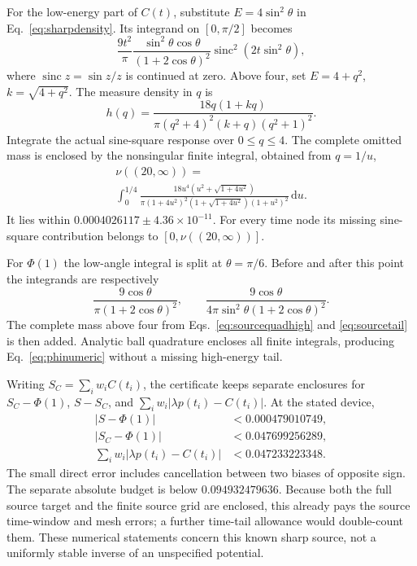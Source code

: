 \documentclass[aps,pra,reprint,superscriptaddress,longbibliography]{revtex4-2}
\newcommand{\dd}{\mathrm d}
\newcommand{\sinc}{\operatorname{sinc}}
\begin{document}
For the low-energy part of $C(t)$, substitute $E=4\sin^2\theta$ in
Eq.~\eqref{eq:sharpdensity}. Its integrand on $[0,\pi/2]$ becomes
\begin{equation}
 \frac{9t^2}{\pi}
 \frac{\sin^2\theta\cos\theta}{(1+2\cos\theta)^2}
                 \sinc^2(2t\sin^2\theta),                   \label{eq:sourcequadlow}
\end{equation}
where $\sinc z=\sin z/z$ is continued at zero. Above four, set
$E=4+q^2$, $k=\sqrt{4+q^2}$. The measure density in $q$ is
\begin{equation}
 h(q)=\frac{18q(1+kq)}
          {\pi(q^2+4)^2(k+q)(q^2+1)^2}.                       \label{eq:sourcequadhigh}
\end{equation}
Integrate the actual sine-square response over $0\le q\le4$.
The complete omitted mass is enclosed by the nonsingular finite
integral, obtained from $q=1/u$,
\begin{equation}
 \begin{gathered}
 \nu((20,\infty))=
 \\
 \int_0^{1/4}\frac{18u^4(u^2+\sqrt{1+4u^2})}
 {\pi(1+4u^2)^2(1+\sqrt{1+4u^2})(1+u^2)^2}\,\dd u.
                                                               \label{eq:sourcetail}
 \end{gathered}
\end{equation}
It lies within $0.0004026117\pm4.36\times10^{-11}$.
For every time node its missing sine-square contribution belongs to
$[0,\nu((20,\infty))]$.

For $\Phi(1)$ the low-angle integral is split at $\theta=\pi/6$.
Before and after this point the integrands are respectively
\begin{equation}
 \frac{9\cos\theta}{\pi(1+2\cos\theta)^2},\qquad
 \frac{9\cos\theta}{4\pi\sin^2\theta(1+2\cos\theta)^2}.
\end{equation}
The complete mass above four from Eqs.~\eqref{eq:sourcequadhigh}
and \eqref{eq:sourcetail} is then added. Analytic ball quadrature
\cite{JohanssonIntegration} encloses all finite integrals, producing
Eq.~\eqref{eq:phinumeric} without a missing high-energy tail.

Writing $S_C=\sum_iw_iC(t_i)$, the certificate keeps separate
enclosures for $S_C-\Phi(1)$, $S-S_C$, and
$\sum_iw_i|\lambda p(t_i)-C(t_i)|$. At the stated device,
\begin{align}
 |S-\Phi(1)|&<0.000479010749,\nonumber\\
 |S_C-\Phi(1)|&<0.047699256289,\label{eq:systematiccounts}\\
 \sum_iw_i|\lambda p(t_i)-C(t_i)|&<0.047233223348.\nonumber
\end{align}
The small direct error includes cancellation between two biases of
opposite sign. The separate absolute budget is below
$0.094932479636$. Because both the full source target and the finite
source grid are enclosed, this already pays the source time-window
and mesh errors; a further time-tail allowance would double-count
them. These numerical statements concern this known sharp source,
not a uniformly stable inverse of an unspecified potential.
\end{document}
